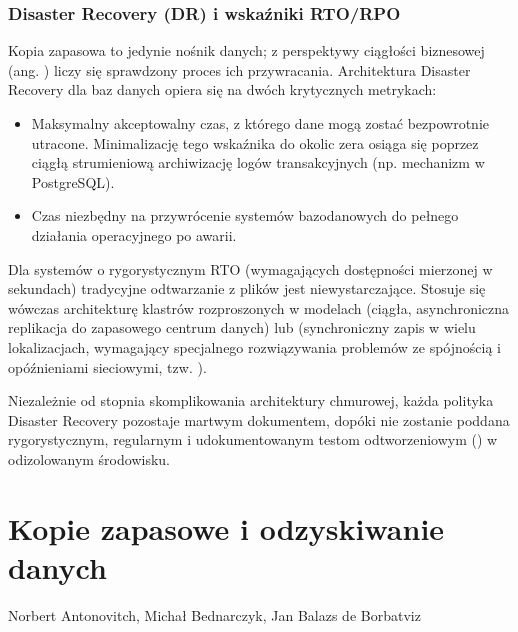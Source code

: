 \documentclass[a4paper,11pt,english,openany,oneside]{sphinxmanual}
\begin{document}
\subsubsection{Disaster Recovery (DR) i wskaźniki RTO/RPO}
\label{\detokenize{rozdzial_2/rozdzial_27/rozdzial_6:disaster-recovery-dr-i-wskazniki-rto-rpo}}
\sphinxAtStartPar
Kopia zapasowa to jedynie nośnik danych; z perspektywy ciągłości biznesowej (ang. ) liczy się sprawdzony proces ich przywracania. Architektura Disaster Recovery dla baz danych opiera się na dwóch krytycznych metrykach:
\begin{itemize}
\item {} 
\sphinxAtStartPar
{} Maksymalny akceptowalny czas, z którego dane mogą zostać bezpowrotnie utracone. Minimalizację tego wskaźnika do okolic zera osiąga się poprzez ciągłą strumieniową archiwizację logów transakcyjnych (np. mechanizm  w PostgreSQL).

\item {} 
\sphinxAtStartPar
{} Czas niezbędny na przywrócenie systemów bazodanowych do pełnego działania operacyjnego po awarii.

\end{itemize}

\sphinxAtStartPar
Dla systemów o rygorystycznym RTO (wymagających dostępności mierzonej w sekundach) tradycyjne odtwarzanie z plików jest niewystarczające. Stosuje się wówczas architekturę klastrów rozproszonych w modelach  (ciągła, asynchroniczna replikacja do zapasowego centrum danych) lub  (synchroniczny zapis w wielu lokalizacjach, wymagający specjalnego rozwiązywania problemów ze spójnością i opóźnieniami sieciowymi, tzw. ).

\sphinxAtStartPar
Niezależnie od stopnia skomplikowania architektury chmurowej, każda polityka Disaster Recovery pozostaje martwym dokumentem, dopóki nie zostanie poddana rygorystycznym, regularnym i udokumentowanym testom odtworzeniowym () w odizolowanym środowisku.

\sphinxstepscope


\section{Kopie zapasowe i odzyskiwanie danych}
\label{\detokenize{rozdzial_2/rozdzial_28/index:kopie-zapasowe-i-odzyskiwanie-danych}}\label{\detokenize{rozdzial_2/rozdzial_28/index::doc}}
\sphinxAtStartPar
{} Norbert Antonovitch, Michał Bednarczyk, Jan Balazs de Borbatviz
\end{document}
